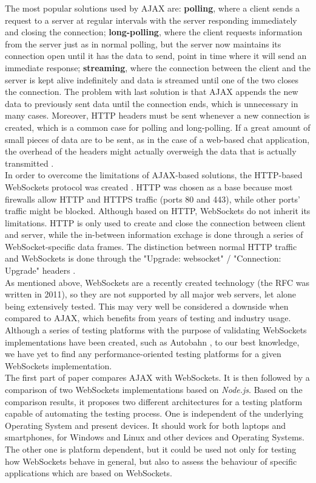 \documentclass[conference]{IEEEtran}
\begin{document}
The most popular solutions used by AJAX are: \textbf{polling}, where a client sends
a request to a server at regular intervals with the server responding immediately
and closing the connection; \textbf{long-polling}, where the client requests
information from the server just as in normal polling, but the server now maintains
its connection open until it has the data to send, point in time where
it will send an immediate response;
\textbf{streaming}, where the connection between the client and the server is
kept alive indefinitely and data is streamed until one of the two closes the
connection. The problem with last solution is that AJAX
appends the new data to previously sent data until the connection ends, which is
unnecessary in many cases. Moreover, HTTP headers must be sent whenever a new
connection is created, which is a common case for polling and long-polling. If
a great amount of small pieces of data are to be sent, as in the case of a
web-based chat application, the overhead of the headers might actually overweigh
the data that is actually transmitted \cite{2009:Misc}.
\\

In order to overcome the limitations of AJAX-based solutions, the HTTP-based
WebSockets protocol was created \cite{RFC}. HTTP was chosen as a base because
most firewalls allow HTTP and HTTPS traffic  (ports 80 and 443), while other
ports' traffic might be blocked. Although based on HTTP, WebSockets do not
inherit its limitations. HTTP is only used to create and close the connection
between client and server, while the in-between information exchage is done
through a series of WebSocket-specific data frames. The distinction between
normal HTTP traffic and WebSockets is done through the "Upgrade: websocket" /
"Connection: Upgrade" headers \cite{RFC}.
\\

As mentioned above, WebSockets are a recently created technology  (the RFC was
written in 2011), so they are not supported by all major web servers, let alone
being extensively tested. This may very well be considered a downside when
compared to AJAX, which benefits from years of testing and industry usage.
Although a series of testing platforms with the purpose of validating WebSockets
implementations have been created, such as Autobahn \cite{Autobahn}, to our best
knowledge, we have yet to find any performance-oriented testing platforms for a
given WebSockets implementation.
\\

The first part of paper compares AJAX with WebSockets. It is then followed by
a comparison of two WebSockets implementations based on \textit{Node.js}.
Based on the comparison results, it proposes two different architectures for
a testing platform capable of automating the testing process.
One is independent
of the underlying Operating System and present devices. It should work for
both laptops and smartphones, for Windows and Linux and other devices and
Operating Systems. The other one is platform dependent, but it could be used
not only for testing how WebSockets behave in general, but also to assess
the behaviour of specific applications which are based on WebSockets.
\vfill\eject
\end{document}

